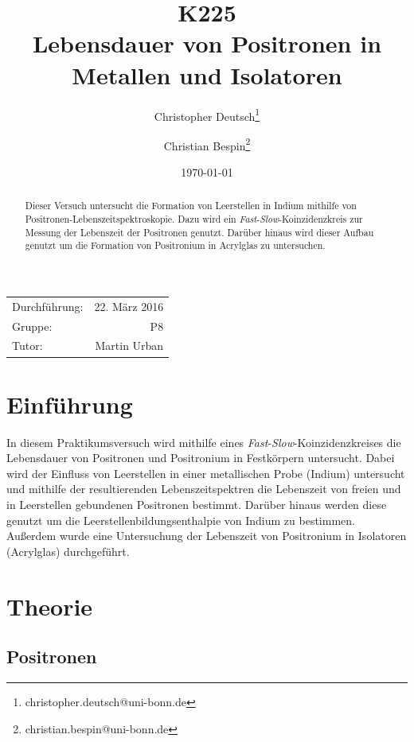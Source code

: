 \documentclass[11pt, a4paper]{article}
\title{K225 \\ Lebensdauer von Positronen in Metallen und Isolatoren}
\author{Christopher Deutsch\footnote{christopher.deutsch@uni-bonn.de} \and Christian Bespin\footnote{christian.bespin@uni-bonn.de}}
\date{\today}
\numberwithin{equation}{section}
\begin{document}
\begin{titlepage}

\maketitle

\begin{center}
\begin{tabular}{l r}
Durchführung: & 22. März 2016 \\
Gruppe: & P8 \\
Tutor: & Martin Urban
\end{tabular}
\end{center}

\begin{abstract}
\noindent
Dieser Versuch untersucht die Formation von Leerstellen in Indium mithilfe von Positronen-Lebenszeitspektroskopie.
Dazu wird ein \textit{Fast}-\textit{Slow}-Koinzidenzkreis zur Messung der Lebenszeit der Positronen genutzt.
Darüber hinaus wird dieser Aufbau genutzt um die Formation von Positronium in Acrylglas zu untersuchen.
\end{abstract}

\end{titlepage}

\tableofcontents
\newpage

\section{Einführung}
In diesem Praktikumsversuch wird mithilfe eines \textit{Fast}-\textit{Slow}-Koinzidenzkreises die Lebensdauer von Positronen und Positronium in Festkörpern untersucht.
Dabei wird der Einfluss von Leerstellen in einer metallischen Probe (Indium) untersucht und mithilfe der resultierenden Lebenszeitspektren die Lebenszeit von freien und in Leerstellen gebundenen Positronen bestimmt.
Darüber hinaus werden diese genutzt um die Leerstellenbildungsenthalpie von Indium zu bestimmen.
Außerdem wurde eine Untersuchung der Lebenszeit von Positronium in Isolatoren (Acrylglas) durchgeführt.

\section{Theorie}

\subsection{Positronen}
\end{document}
